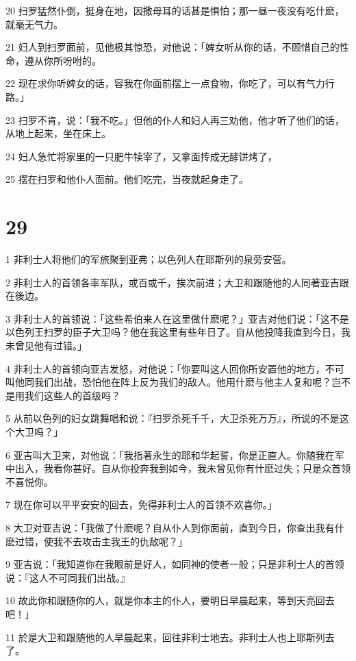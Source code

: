 \par 20 扫罗猛然仆倒，挺身在地，因撒母耳的话甚是惧怕；那一昼一夜没有吃什麽，就毫无气力。
\par 21 妇人到扫罗面前，见他极其惊恐，对他说：「婢女听从你的话，不顾惜自己的性命，遵从你所吩咐的。
\par 22 现在求你听婢女的话，容我在你面前摆上一点食物，你吃了，可以有气力行路。」
\par 23 扫罗不肯，说：「我不吃。」但他的仆人和妇人再三劝他，他才听了他们的话，从地上起来，坐在床上。
\par 24 妇人急忙将家里的一只肥牛犊宰了，又拿面抟成无酵饼烤了，
\par 25 摆在扫罗和他仆人面前。他们吃完，当夜就起身走了。

\chapter{29}

\par 1 非利士人将他们的军旅聚到亚弗；以色列人在耶斯列的泉旁安营。
\par 2 非利士人的首领各率军队，或百或千，挨次前进；大卫和跟随他的人同著亚吉跟在後边。
\par 3 非利士人的首领说：「这些希伯来人在这里做什麽呢？」亚吉对他们说：「这不是以色列王扫罗的臣子大卫吗？他在我这里有些年日了。自从他投降我直到今日，我未曾见他有过错。」
\par 4 非利士人的首领向亚吉发怒，对他说：「你要叫这人回你所安置他的地方，不可叫他同我们出战，恐怕他在阵上反为我们的敌人。他用什麽与他主人复和呢？岂不是用我们这些人的首级吗？
\par 5 从前以色列的妇女跳舞唱和说：『扫罗杀死千千，大卫杀死万万』，所说的不是这个大卫吗？」
\par 6 亚吉叫大卫来，对他说：「我指著永生的耶和华起誓，你是正直人。你随我在军中出入，我看你甚好。自从你投奔我到如今，我未曾见你有什麽过失；只是众首领不喜悦你。
\par 7 现在你可以平平安安的回去，免得非利士人的首领不欢喜你。」
\par 8 大卫对亚吉说：「我做了什麽呢？自从仆人到你面前，直到今日，你查出我有什麽过错，使我不去攻击主我王的仇敌呢？」
\par 9 亚吉说：「我知道你在我眼前是好人，如同神的使者一般；只是非利士人的首领说：『这人不可同我们出战。』
\par 10 故此你和跟随你的人，就是你本主的仆人，要明日早晨起来，等到天亮回去吧！」
\par 11 於是大卫和跟随他的人早晨起来，回往非利士地去。非利士人也上耶斯列去了。

